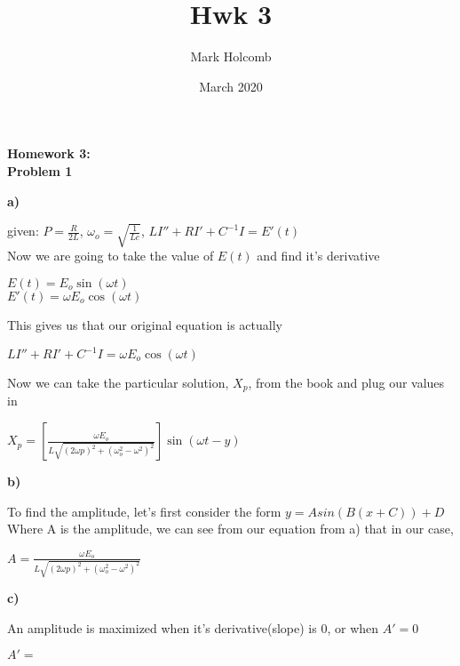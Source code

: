 \documentclass[12pt, letterpaper]{article}
\title{Hwk 3}
\author{Mark Holcomb}
\date{March 2020}
\begin{document}
\LARGE\textbf{Homework 3:}\\

\large\textbf{Problem 1}

\textbf{a)}

given: $P =\frac{R}{2L}$,\indent
       $\omega_o = \sqrt{\frac{1}{Lc}}$,\indent
       $L I'' + RI' + C^{-1}I = E'(t)$ \\

       Now we are going to take the value of $E(t)$ and find it's derivative
       
       \begin{center}
        $E(t) = E_o \sin(\omega t)$\\
        $E'(t) = \omega E_o \cos(\omega t)$
       \end{center}
       
       This gives us that our original equation is actually
       \begin{center}
        $L I'' + RI' + C^{-1}I = \omega E_o \cos(\omega t)$
       \end{center}

       Now we can take the particular solution, $X_p$, from the book and plug our values in
       \begin{center}
        $X_p = [\frac{\omega E_o}{L \sqrt{(2 \omega p)^2 + (\omega_o^2 - \omega^2)^2}}] \sin(\omega t - y)$
       \end{center}

\textbf{b)}

To find the amplitude, let's first consider the form $y = A sin(B(x + C)) + D$\\

Where A is the amplitude, we can see from our equation from a) that in our case,
\begin{center}
    $A = \frac{\omega E_o}{L \sqrt{(2 \omega p)^2 + (\omega_o^2 - \omega^2)^2}}$
\end{center}

\textbf{c)}

An amplitude is maximized when it's derivative(slope) is 0, or when $A' = 0$

\begin{center}
    $A' = $
\end{center}
\end{document}
